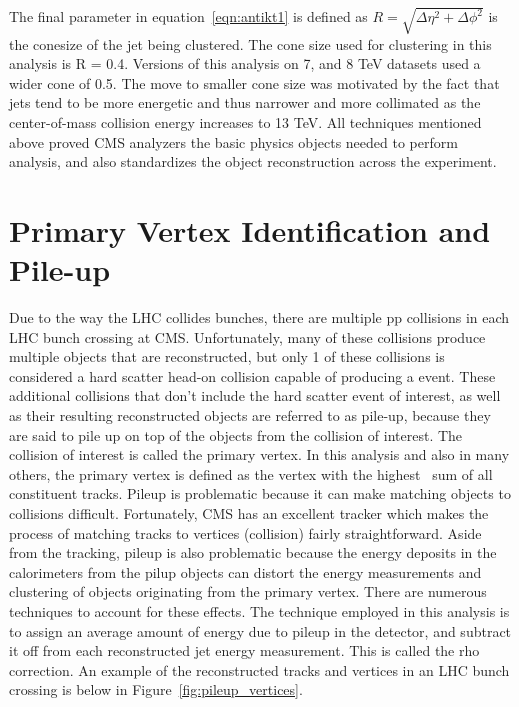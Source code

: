 The final parameter in equation~\ref{eqn:antikt1} is defined as $R = \sqrt{\Delta\eta^{2}+\Delta\phi^{2}}$ is the conesize of the jet being clustered.
The cone size used for clustering in this analysis is R = 0.4. Versions of this analysis on 7, and 8 TeV datasets used a wider cone of 0.5. The move to smaller cone size
was motivated by the fact that jets tend to be more energetic and thus narrower and more collimated as the center-of-mass collision energy increases to 13 TeV. All techniques
mentioned above proved CMS analyzers the basic physics objects needed to perform analysis, and also standardizes the object reconstruction across the experiment. 

\section{Primary Vertex Identification and Pile-up}
Due to the way the LHC collides bunches, there are multiple pp collisions in each LHC bunch crossing at CMS. Unfortunately, many of these collisions produce
multiple objects that are reconstructed, but only 1 of these collisions is considered a hard scatter head-on collision capable of producing a \tth event.
These additional collisions that don't include the hard scatter event of interest, as well as their resulting reconstructed objects are referred to as pile-up, because
they are said to pile up on top of the objects from the collision of interest.
The collision of interest is called the primary vertex.
In this analysis and also in many others, the primary vertex is defined as the vertex with the highest \pt~sum of all constituent tracks.  
Pileup is problematic because it can make matching objects to collisions difficult. Fortunately,
CMS has an excellent tracker which makes the process of matching tracks to vertices (collision) fairly straightforward. Aside from the tracking, pileup is also
problematic because the energy deposits in the calorimeters from the pilup objects can distort the energy measurements and clustering of objects originating from
the primary vertex. There are numerous techniques to account for these effects. The technique employed in this analysis is to assign an average amount of energy
due to pileup in the detector, and subtract it off from each reconstructed jet energy measurement. This is called the rho correction.  
An example of the reconstructed tracks and vertices in an
LHC bunch crossing is below in Figure~\ref{fig:pileup_vertices}.

